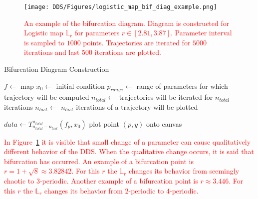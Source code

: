 \begin{figure}[!h]
    \centering
    \texttt{[image: DDS/Figures/logistic\_map\_bif\_diag\_example.png]}
    \caption{
        \textcolor{red}{
        An example of the bifurcation diagram. 
        Diagram is constructed for Logistic map $\mathbb{L}_{r}$ for parameters $r \in [ 2.81, 3.87 ]$. 
        Parameter interval is sampled to $1000$ points. 
        Trajectories are iterated for $5000$ iterations and last $500$ iterations are plotted.
        }
    }
    \label{fig:bif_diag_example}
\end{figure}

\begin{algorithm}
\caption{Bifurcation Diagram Construction}\label{bif_diag_alg}
\begin{algorithmic}[1]
\Statex $f \gets$ map
\Statex $x_0 \gets$ initial condition
\Statex $p_{range} \gets$ range of parameters for which trajectory will be computed
\Statex $n_{total} \gets$ trajectories will be iterated for $n_{total}$ iterations
\Statex $n_{last} \gets$ $n_{last}$ iterations of a trajectory will be plotted

    \State $data \leftarrow T_{n_{total}-n_{last}}^{n_{total}}(f_p, x_0)$
        \State plot point $(p, y)$ onto canvas
    \EndFor
\EndFor

\end{algorithmic}
\end{algorithm}

\begin{remark}
    \textcolor{red}{
    In Figure~\ref{fig:bif_diag_example} it is visible that small change of a parameter can cause qualitatively different behavior of the DDS.
    When the qualitative change occurs, it is said that bifurcation has occurred.
    An example of a bifurcation point is $r = 1+\sqrt{8} \approx 3.82842$. For this $r$ the $\mathbb{L}_{r}$ changes its behavior from seemingly chaotic to $3$-periodic. 
    Another example of a bifurcation point is $r \approx 3.446$. For this $r$ the $\mathbb{L}_{r}$ changes its behavior from $2$-periodic to $4$-periodic.
    }
\end{remark}